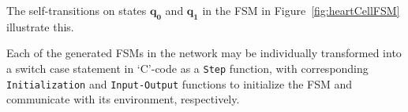 The self-transitions on states $\mathbf{q_{0}}$ and $\mathbf{q_{1}}$ in the 
\ac{FSM} in Figure~\ref{fig:heartCellFSM} illustrate this.


Each of the generated \acp{FSM} in the network may be individually
transformed into a switch case statement in `C'-code as a \texttt{Step} 
function, with corresponding \texttt{Initialization} and \texttt{Input-Output}
functions to initialize the \ac{FSM} and communicate with its
environment, respectively.



